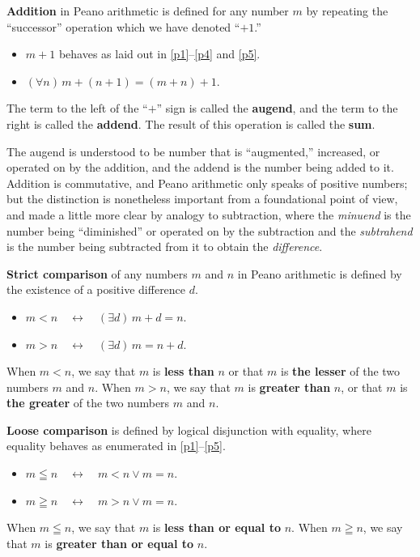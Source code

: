 \documentclass[letterpaper]{article}
\newcommand{\Axiom}{{\large\Bearing}}
\newcommand{\AxiomSchema}{{\large\LooseBearing}}
\begin{document}
\begin{definition}
	\textbf{Addition} in Peano arithmetic is defined for any number $m$ by repeating the ``successor'' operation which we have denoted ``$+1$.''
	\begin{itemize}
		\item $m+1$ behaves as laid out in \Axiom\Axiom \ref{p1}--\ref{p4} and \AxiomSchema\ref{p5}.
		\item $(\forall n)\,m+(n+1)=(m+n)+1$.
	\end{itemize}
	The term to the left of the ``$+$'' sign is called the \textbf{augend}, and the term to the right is called the \textbf{addend}.  The result of this operation is called the \textbf{sum}.
\end{definition}
\begin{remark}
	The augend is understood to be number that is ``augmented,'' increased, or operated on by the addition, and the addend is the number being added to it. Addition is commutative, and Peano arithmetic only speaks of positive numbers; but the distinction is nonetheless important from a foundational point of view, and made a little more clear by analogy to subtraction, where the \textit{minuend} is the number being ``diminished'' or operated on by the subtraction and the \textit{subtrahend} is the number being subtracted from it to obtain the \textit{difference}.
\end{remark}
\begin{definition}
	\textbf{Strict comparison} of any numbers $m$ and $n$ in Peano arithmetic is defined by the existence of a positive difference $d$.
	\begin{itemize}
		\item $m<n\quad\longleftrightarrow\quad (\exists d)\,m+d=n$.
		\item $m>n\quad\longleftrightarrow\quad (\exists d)\,m=n+d$.	
	\end{itemize}
	When $m<n$, we say that $m$ is \textbf{less than} $n$ or that $m$ is \textbf{the lesser} of the two numbers $m$ and $n$.  When $m>n$, we say that $m$ is \textbf{greater than} $n$, or that $m$ is \textbf{the greater} of the two numbers $m$ and $n$.
\end{definition}

\begin{definition}
	\textbf{Loose comparison} is defined by logical disjunction with equality, where equality behaves as enumerated in \Axiom\Axiom \ref{p1}--\ref{p5}.
	\begin{itemize}
		\item $m\leqq n\quad\longleftrightarrow\quad m<n\lor m=n$.
		\item $m\geqq n\quad\longleftrightarrow\quad m>n\lor m=n$.	
	\end{itemize}
When $m\leqq n$, we say that $m$ is \textbf{less than or equal to} $n$.  When $m\geqq n$, we say that $m$ is \textbf{greater than or equal to} $n$.
\end{definition}
\end{document}
